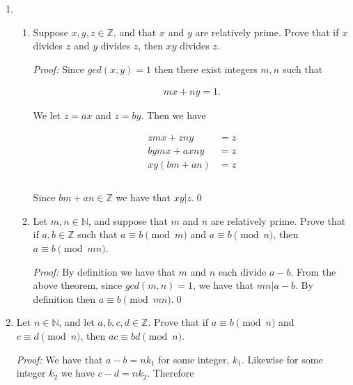 \documentclass[12pt]{article}
\begin{document}
{\begin{enumerate}
We are now able to compute

\begin{align*}
  x_0 &= 2\cdot 2\cdot 35 + 3\cdot 1 \cdot 21 + 4\cdot 1\cdot 15 \\
  &= 263.
\end{align*}

The solution is then the congruence class of [263] mod $N=105$.

\item
\begin{enumerate}
\item Suppose $x,y,z \in \mathbb{Z}$, and that $x$ and $y$ are relatively prime. Prove that if $x$ divides $z$ and $y$ divides $z$, then $xy$ divides $z$.

{\it Proof:} Since $gcd(x,y)=1$ then there exist integers $m,n$ such that

\begin{align*}
  mx+ny=1.
\end{align*}

We let $z = ax$ and $z = by$.  Then we have

\begin{align*}
  zmx+zny&=z\\
  bymx+axny&=z\\
  xy(bm+an)&=z\\\\
\end{align*}

Since $bm+an\in\mathbb Z$ we have that $xy|z$.\qed

\item Let $m, n \in \mathbb{N}$, and suppose that $m$ and $n$ are relatively prime. Prove that if $a, b \in \mathbb{Z}$ such that $a \equiv b \pmod m$ and $a \equiv b \pmod n$, then $a \equiv b \pmod{mn}$.

{\it Proof:} By definition we have that $m$ and $n$ each divide $a-b$.  From the above theorem, since $gcd(m,n)=1$, we have that $mn|a-b$.  By definition then $a\equiv b\pmod {mn}$.\qed
\end{enumerate}

\item Let $n \in \mathbb{N}$, and let $a, b, c, d \in \mathbb{Z}$. Prove that if $a \equiv b \pmod n$ and \\ $c \equiv d \pmod n$, then $ac \equiv bd \pmod n$.

{\it Proof:} We have that $a-b = nk_1$ for some integer, $k_1$.  Likewise for some integer $k_2$ we have $c-d=nk_2$.  Therefore


\end{enumerate}}
\end{document}
